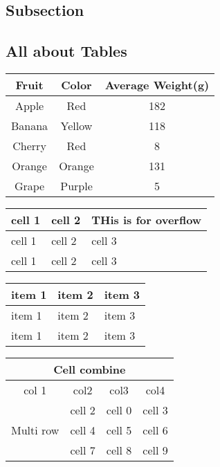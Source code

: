 \documentclass{report}
\begin{document}
\subsection{Subsection}
\lipsum[1-2]
\subsection{All about Tables}
\begin{center}
    \begin{tabular}{|c|c|c|}
    \hline
        \textbf{Fruit} & \textbf{Color} & \textbf{Average Weight(g)} \\
        \hline
        Apple & Red & 182 \\
        \hline
        Banana & Yellow & 118 \\
        \hline
        Cherry & Red & 8 \\
        \hline
        Orange & Orange & 131 \\
        \hline
        Grape & Purple & 5 \\
        \hline
    \end{tabular}
\end{center}
\begin{center}
    \begin{tabular}{|m{5em}|m{1cm}|m{1cm}|}
        \hline
        cell 1 & cell 2 & THis is for overflow \\
        \hline
        cell 1 & cell 2 & cell 3 \\
       \hline
       cell 1 & cell 2 & cell 3 \\
       \hline
    \end{tabular}
\end{center}


\begin{center}
    \begin{tabularx}{0.8\textwidth}{
        | >{\raggedright\arraybackslash}X
        | >{\centering\arraybackslash}X
        | >{\raggedleft\arraybackslash}X|}    
        \hline
        item 1 & item 2 & item 3 \\
        \hline
        item 1 & item 2 & item 3 \\
        \hline
        item 1 & item 2 & item 3 \\
        \hline
    \end{tabularx}   
\end{center}

\begin{center}

\end{center}
    \begin{tabular}{|c|c|c|c|}
       \hline
       \multicolumn{4}{|c|}{Cell combine } \\
       \hline
        col 1 & col2 & col3 & col4  \\
       \hline
       \multirow{3}{*}{Multi row} & cell 2& cell 0 & cell 3 \\
       \cline{2-4}
       & cell 4 & cell 5 & cell 6 \\
       \cline{2-4}
       & cell 7 & cell 8 & cell 9 \\
       \hline
    \end{tabular}
\end{document}
